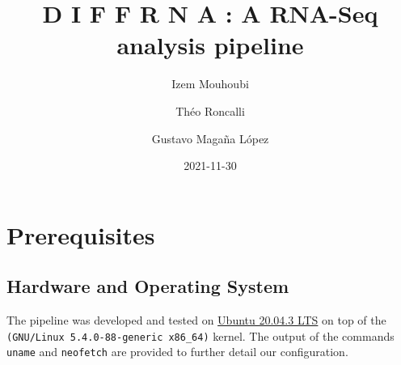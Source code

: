 \documentclass[
  openany]{book}
\title{D I F F R N A : A RNA-Seq analysis pipeline}
\author{Izem Mouhoubi \and Théo Roncalli \and Gustavo Magaña López}
\date{2021-11-30}
\begin{document}
\maketitle

{
\setcounter{tocdepth}{1}
\tableofcontents
}
\hypertarget{prerequisites}{%
\chapter{Prerequisites}\label{prerequisites}}

\hypertarget{hardware-and-operating-system}{%
\section{Hardware and Operating System}\label{hardware-and-operating-system}}

The pipeline was developed and tested on \href{https://fridge.ubuntu.com/2021/08/27/ubuntu-20-04-3-lts-released/}{Ubuntu 20.04.3 LTS}
on top of the \texttt{(GNU/Linux\ 5.4.0-88-generic\ x86\_64)} kernel. The output of the commands \texttt{uname} and \texttt{neofetch} are provided to further detail our configuration.
\end{document}
